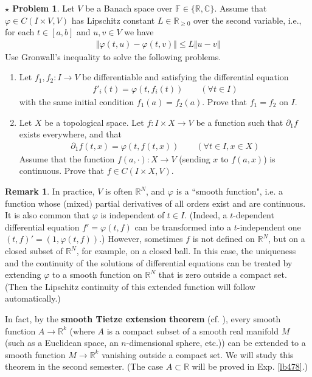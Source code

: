 \documentclass[12pt,b5paper,notitlepage]{article}
\theoremstyle{definition}
\newtheorem{rem}[df]{Remark}
\newtheorem{sprob}[prob]{\color{red}$\star$ Problem}
\theoremstyle{plain}
\newcommand{\Cbb}{\mathbb C}
\newcommand{\Rbb}{\mathbb R}
\newcommand{\Fbb}{\mathbb F}
\newcommand{\dps}{\displaystyle}
\numberwithin{equation}{section}
\begin{document}
\begin{sprob}
Let $V$ be a Banach space over $\Fbb\in\{\Rbb,\Cbb\}$. Assume that $\varphi\in C(I\times V,V)$ has Lipschitz constant $L\in\Rbb_{\geq0}$ over the second variable, i.e., for each $t\in[a,b]$ and $u,v\in V$ we have
\begin{align}
\Vert\varphi(t,u)-\varphi(t,v)\Vert\leq L\Vert u-v\Vert
\end{align}
Use Gronwall's inequality  to solve the following problems.
\begin{enumerate}
\item Let $f_1,f_2:I\rightarrow V$ be differentiable and satisfying the differential equation
\begin{align*}
\dps f'_i(t)=\varphi(t,f_i(t))\qquad (\forall t\in I)
\end{align*}
with the same initial condition $f_1(a)=f_2(a)$. Prove that $f_1=f_2$ on $I$.
\item Let $X$ be a topological space. Let $f:I\times X\rightarrow V$ be a function such that $\partial_1 f$ exists everywhere, and that
\begin{align*}
\partial_1 f(t,x)=\varphi(t,f(t,x))\qquad(\forall t\in I,x\in X)
\end{align*}
Assume that the function $f(a,\cdot):X\rightarrow V$ (sending $x$ to $f(a,x)$) is continuous. Prove that $f\in C(I\times X,V)$.
\end{enumerate} 
\end{sprob}


\begin{rem}\label{lb479}
In practice, $V$ is often $\Rbb^N$, and $\varphi$ is a ``smooth function", i.e. a function whose (mixed) partial derivatives of all orders exist and are continuous. It is also common that $\varphi$ is independent of $t\in I$. (Indeed, a $t$-dependent differential equation $f'=\varphi(t,f)$ can be transformed into a $t$-independent one $(t,f)'=(1,\varphi(t,f))$.) However, sometimes $f$ is not defined on $\Rbb^N$, but on a closed subset of $\Rbb^N$, for example, on a closed ball. In this case, the uniqueness and the continuity of the solutions of differential equations can be treated by extending $\varphi$ to a smooth function on $\Rbb^N$ that is zero outside a compact set. (Then the Lipschitz continuity of this extended function will follow automatically.) 

In fact, by the \textbf{smooth Tietze extension theorem} (cf. \cite[Lem. 2.26]{Lee}), every smooth function $A\rightarrow\Rbb^k$ (where $A$ is a compact subset of a smooth real manifold $M$ (such as a Euclidean space, an $n$-dimensional sphere, etc.)) can be extended to a smooth function $M\rightarrow\Rbb^k$ vanishing outside a compact set. We will study this theorem in the second semester. (The case $A\subset\Rbb$ will be proved in Exp. \ref{lb478}.) \hfill\qedsymbol
\end{rem}
\end{document}
